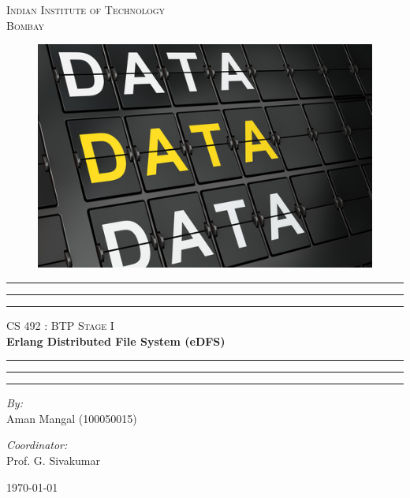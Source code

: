 \begin{titlepage}
\begin{center}
	\textsc{\LARGE Indian Institute of Technology
			\\Bombay} \\[2.5cm]
	\begin{figure}[ht!]
	\begin{center}
		\includegraphics[scale = 1.4]{images/1}
	\end{center}
	\end{figure}

    \vspace*{-0.6cm}
	\hrule \hrule \hrule
	\vspace{0.5cm}	
	\textsc{\Large CS 492 : BTP Stage I}\\[0.5cm]
	{\huge \bfseries Erlang Distributed File System (eDFS)} \\[0.5cm]
	\hrule \hrule \hrule
	\vspace{4cm}
	
	\begin{minipage}{0.4\textwidth}
	\begin{flushleft} \large
		\emph{By:} \\
		Aman Mangal (100050015)
	\end{flushleft}
	\end{minipage}
	\begin{minipage}{0.4\textwidth}
	\begin{flushright} \large
		\emph{Coordinator:} \\
		Prof. G. Sivakumar
	\end{flushright}
	\end{minipage}
	\vspace{0.5cm}
	
	{\large \today}
\end{center}
\end{titlepage}
